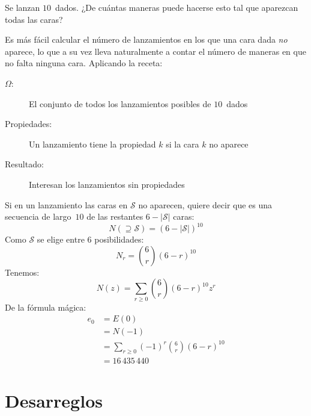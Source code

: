   \begin{example}
    Se lanzan \(10\)~dados.
    ¿De cuántas maneras puede hacerse esto
    tal que aparezcan todas las caras?

    Es más fácil calcular el número de lanzamientos
    en los que una cara dada \emph{no} aparece,
    lo que a su vez lleva naturalmente a contar el número de maneras
    en que no falta ninguna cara.
    Aplicando la receta:
    \begin{description}
    \item[\boldmath\(\Omega\)\unboldmath:]
      El conjunto de todos los lanzamientos posibles de \(10\)~dados
    \item[Propiedades:]
      Un lanzamiento tiene la propiedad \(k\) si la cara \(k\) no aparece
    \item[Resultado:]
      Interesan los lanzamientos sin propiedades
    \end{description}
    Si en un lanzamiento las caras en \(\mathcal{S}\) no aparecen,
    quiere decir que es una secuencia de largo~\(10\)
    de las restantes \(6 - \lvert \mathcal{S} \rvert\) caras:
    \begin{equation*}
      N(\supseteq \mathcal{S})
	= (6 - \lvert \mathcal{S} \rvert)^{10}
    \end{equation*}
    Como \(\mathcal{S}\) se elige entre \(6\) posibilidades:
    \begin{equation*}
      N_r
	= \binom{6}{r} (6 - r)^{10}
    \end{equation*}
    Tenemos:
    \begin{equation*}
      N(z)
	= \sum_{r \ge 0} \binom{6}{r} (6 - r)^{10} z^r
    \end{equation*}
    De la fórmula mágica:
    \begin{align*}
      e_0
	&= E(0) \\
	&= N(-1) \\
	&= \sum_{r \ge 0} (-1)^r \binom{6}{r} (6 - r)^{10} \\
	&= 16\,435\,440
    \end{align*}
  \end{example}

\section{Desarreglos}
\label{sec:desarreglos-pie}

